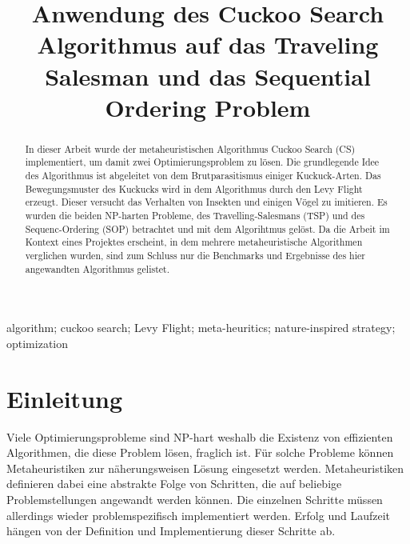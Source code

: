 \documentclass[conference]{IEEEtran}
\begin{document}
  \title{Anwendung des Cuckoo Search Algorithmus auf das Traveling Salesman und das Sequential Ordering Problem}

  \author{
    \and
  }

  \maketitle

  \begin{abstract}
    In dieser Arbeit wurde der metaheuristischen Algorithmus Cuckoo Search (CS) implementiert, um damit zwei Optimierungsproblem zu lösen. 
    Die grundlegende Idee des Algorithmus ist abgeleitet von dem Brutparasitismus einiger Kuckuck-Arten. Das Bewegungsmuster des Kuckucks 
    wird in dem Algorithmus durch den Levy Flight erzeugt. Dieser versucht das Verhalten von Insekten und einigen Vögel zu imitieren.
    Es wurden die beiden NP-harten Probleme, des Travelling-Salesmans (TSP) und des Sequenc-Ordering (SOP) betrachtet 
    und mit dem Algorihtmus gelöst. Da die Arbeit im Kontext eines Projektes erscheint, in dem mehrere metaheuristische Algorithmen verglichen 
    wurden, sind zum Schluss nur die Benchmarks und Ergebnisse des hier angewandten Algorithmus gelistet.
  \end{abstract}

  \begin{IEEEkeywords}
    algorithm; cuckoo search; Levy Flight; meta-heuritics; nature-inspired strategy; optimization
  \end{IEEEkeywords}

  \section{Einleitung}
    Viele Optimierungsprobleme sind NP-hart weshalb die Existenz von effizienten Algorithmen, die diese Problem lösen, fraglich ist. Für solche 
    Probleme können Metaheuristiken zur näherungsweisen Lösung eingesetzt werden. Metaheuristiken definieren dabei eine abstrakte Folge 
    von Schritten, die auf beliebige Problemstellungen angewandt werden können. Die einzelnen Schritte müssen allerdings wieder 
    problemspezifisch implementiert werden. Erfolg und Laufzeit hängen von der Definition und Implementierung dieser Schritte ab. 
\end{document}
